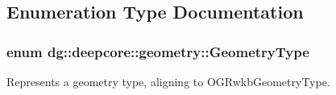 \subsection{Enumeration Type Documentation}
\subsubsection[{\texorpdfstring{Geometry\+Type}{GeometryType}}]{\setlength{\rightskip}{0pt plus 5cm}enum {\bf dg\+::deepcore\+::geometry\+::\+Geometry\+Type}\hspace{0.3cm}{\ttfamily [strong]}}\hypertarget{group___geometry_module_gad9a3ec0b998629dbcf8274512700964a}{}\label{group___geometry_module_gad9a3ec0b998629dbcf8274512700964a}


Represents a geometry type, aligning to O\+G\+Rwkb\+Geometry\+Type. 

